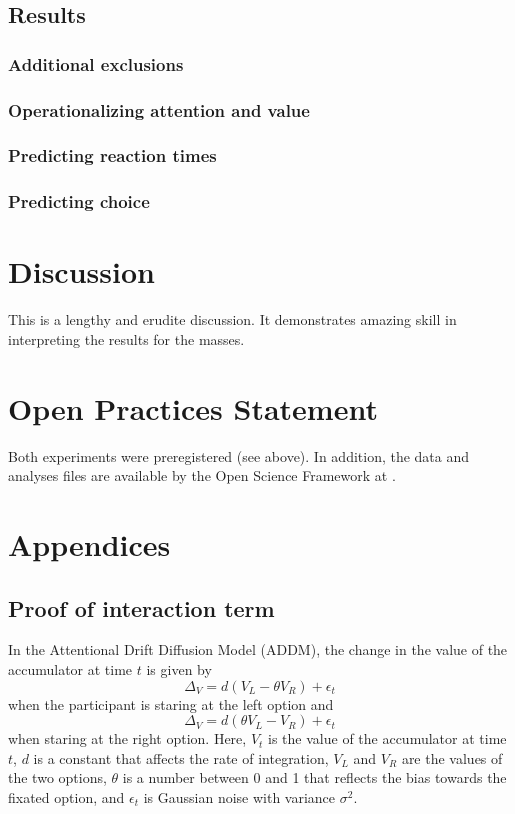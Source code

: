 \documentclass[doc, a4paper, apacite]{apa6}
\begin{document}
\subsection{Results}

\subsubsection{Additional exclusions}

\subsubsection{Operationalizing attention and value}

\subsubsection{Predicting reaction times}

\subsubsection{Predicting choice}



\section{Discussion}
This is a lengthy and erudite discussion.  It demonstrates amazing
skill in interpreting the results for the masses.

\section{Open Practices Statement}
Both experiments were preregistered (see above). In addition, the data and analyses files are available by the Open Science Framework at \url{}. 

\clearpage
\newpage



\clearpage
\newpage
\section{Appendices}
\subsection{Proof of interaction term}
In the Attentional Drift Diffusion Model (ADDM), the change in the value of the accumulator at time $t$ is given by 
\begin{equation}
	\Delta_V = d(V_L - \theta V_R) + \epsilon_t
\end{equation}
when the participant is staring at the left option and
\begin{equation}
	\Delta_V = d(\theta V_L - V_R) + \epsilon_t
\end{equation}
when staring at the right option. Here, $V_t$ is the value of the accumulator at time $t$, $d$ is a constant that affects the rate of integration, $V_L$ and $V_R$ are the values of the two options, $\theta$ is a number between 0 and 1 that reflects the bias towards the fixated option, and $\epsilon_t$ is Gaussian noise with variance $\sigma^2$. 
\end{document}
